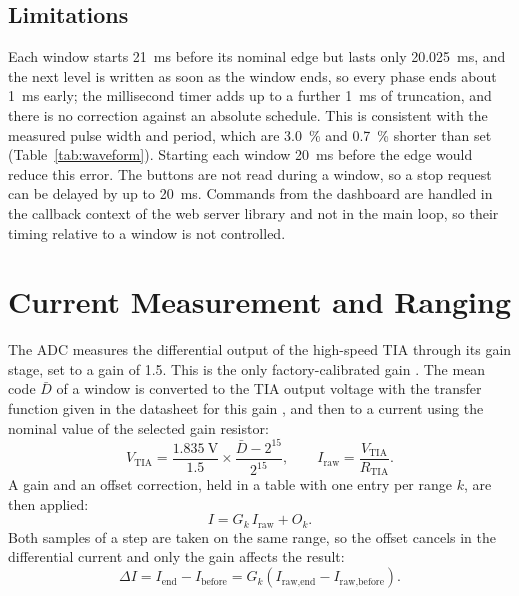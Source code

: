 \subsection{Limitations}
\label{sec:sw_limitations}

Each window starts \SI{21}{\milli\second} before its nominal edge but lasts only \SI{20.025}{\milli\second}, and the next level is written as soon as the window ends, so every phase ends about \SI{1}{\milli\second} early; the millisecond timer adds up to a further \SI{1}{\milli\second} of truncation, and there is no correction against an absolute schedule. This is consistent with the measured pulse width and period, which are \SI{3.0}{\percent} and \SI{0.7}{\percent} shorter than set (Table~\ref{tab:waveform}). Starting each window \SI{20}{\milli\second} before the edge would reduce this error. The buttons are not read during
a window, so a stop request can be delayed by up to \SI{20}{\milli\second}.
Commands from the dashboard are handled in the callback context of the web
server library and not in the main loop, so their timing relative to a window
is not controlled.

\section{Current Measurement and Ranging}
\label{sec:sw_current}

The ADC measures the differential output of the high-speed TIA through its
gain stage, set to a gain of 1.5. This is the only factory-calibrated gain \cite[p.~56]{ad5941_ds}. The mean code $\bar{D}$ of a
window is converted to the TIA output voltage with the transfer function given
in the datasheet for this gain \cite[p.~56]{ad5941_ds}, and then to a current
using the nominal value of the selected gain resistor:
\begin{equation}
  V_\text{TIA} = \frac{\SI{1.835}{\volt}}{1.5}\times\frac{\bar{D} - 2^{15}}{2^{15}},
  \qquad
  I_\text{raw} = \frac{V_\text{TIA}}{R_\text{TIA}}.
  \label{eq:sw_code_to_current}
\end{equation}
A gain and an offset correction, held in a table with one entry per range $k$, are then applied:
\begin{equation}
  I = G_k\, I_\text{raw} + O_k .
  \label{eq:sw_cal}
\end{equation}
Both samples of a step are taken on the same range, so the offset cancels in
the differential current and only the gain affects the result:
\begin{equation}
  \Delta I = I_\text{end} - I_\text{before}
           = G_k \left( I_\text{raw,end} - I_\text{raw,before} \right).
  \label{eq:sw_delta_i}
\end{equation}

